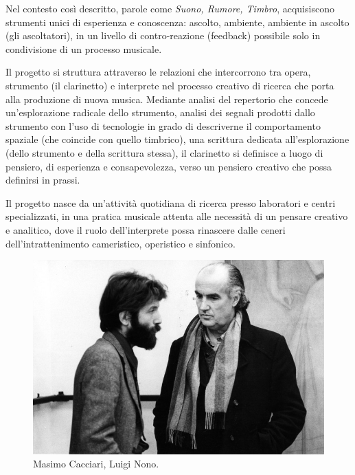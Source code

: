 \documentclass{gs-adonis}
\begin{document}
Nel contesto così descritto, parole come \emph{Suono, Rumore, Timbro},
acquisiscono strumenti unici di esperienza e conoscenza: ascolto, ambiente,
ambiente in ascolto (gli ascoltatori), in un livello di contro-reazione
(feedback) possibile solo in condivisione di un processo musicale.

Il progetto si struttura attraverso le relazioni che intercorrono tra opera,
strumento (il clarinetto) e interprete nel processo creativo di ricerca che
porta alla produzione di nuova musica. Mediante analisi del repertorio che
concede un'esplorazione radicale dello strumento, analisi dei segnali prodotti
dallo strumento con l'uso di tecnologie in grado di descriverne il
comportamento spaziale (che coincide con quello timbrico), una scrittura
dedicata all'esplorazione (dello strumento e della scrittura stessa), il
clarinetto si definisce a luogo di pensiero, di esperienza e consapevolezza,
verso un pensiero creativo che possa definirsi in prassi.

Il progetto nasce da un'attività quotidiana di ricerca presso laboratori
e centri specializzati, in una pratica musicale attenta alle necessità di un
pensare creativo e analitico, dove il ruolo dell'interprete possa rinascere
dalle ceneri dell'intrattenimento cameristico, operistico e sinfonico.

\begin{figure}[t]
  \centering
  \includegraphics[width=\linewidth]{images/luigi-nono-massimo-cacciari.jpg}
  \captionsetup{width=.81\linewidth}
  \caption{Masimo Cacciari, Luigi Nono.}
  \label{cacciari}
\end{figure}
\end{document}
